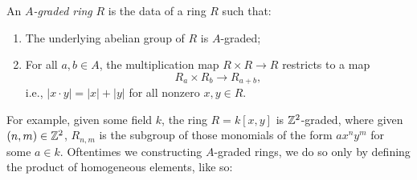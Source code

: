 \documentclass[../main.tex]{subfiles}
\begin{document}
\begin{definition}
	An \textit{$A$-graded ring} $R$ is the data of a ring $R$ such that:\begin{enumerate}
		\item The underlying abelian group of $R$ is $A$-graded;
		\item For all $a,b\in A$, the multiplication map $R\times R\to R$ restricts to a map
		\[R_a\times R_b\to R_{a+b},\]
		i.e., $|x\cdot y|=|x|+|y|$ for all nonzero $x,y\in R$.
	\end{enumerate}
\end{definition}

For example, given some field $k$, the ring $R=k[x,y]$ is $\mathbb{Z}^2$-graded, where given $(n,m)\in\mathbb{Z}^2$, $R_{n,m}$ is the subgroup of those monomials of the form $ax^ny^m$ for some $a\in k$. Oftentimes we constructing $A$-graded rings, we do so only by defining the product of homogeneous elements, like so:
\end{document}
